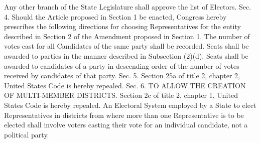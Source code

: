\documentclass{article}
\begin{document}
    Any other branch of the State Legislature shall approve the list of Electors.
    Sec. 4. Should the Article proposed in Section 1 be enacted, Congress hereby prescribes the following directions for choosing Representatives for the entity described in Section 2 of the Amendment proposed in Section 1. 
    The number of votes cast for all Candidates of the same party shall be recorded.
    Seats shall be awarded to parties in the manner described in Subsection (2)(d).
    Seats shall be awarded to candidates of a party in descending order of the number of votes received by candidates of that party. 
    Sec. 5. Section 25a of title 2, chapter 2, United States Code is hereby repealed.
    Sec. 6. TO ALLOW THE CREATION OF MULTI-MEMBER DISTRICTS.
    Section 2c of title 2, chapter 1, United States Code is hereby repealed.
    An Electoral System employed by a State to elect Representatives in districts from where more than one Representative is to be elected shall involve voters casting their vote for an individual candidate, not a political party.
\end{document}
